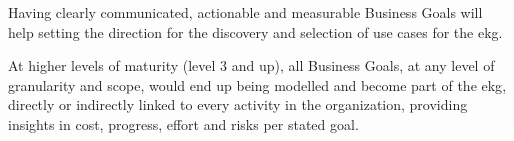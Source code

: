 %
%
Having clearly communicated, actionable and measurable Business Goals will help setting the direction
for the discovery and selection of use cases for the \gls{ekg}.

At higher levels of maturity (level 3 and up), all Business Goals, at any level of granularity and scope,
would end up being modelled and become part of the \gls{ekg}, directly or indirectly linked to every activity
in the organization, providing insights in cost, progress, effort and risks per stated goal.

